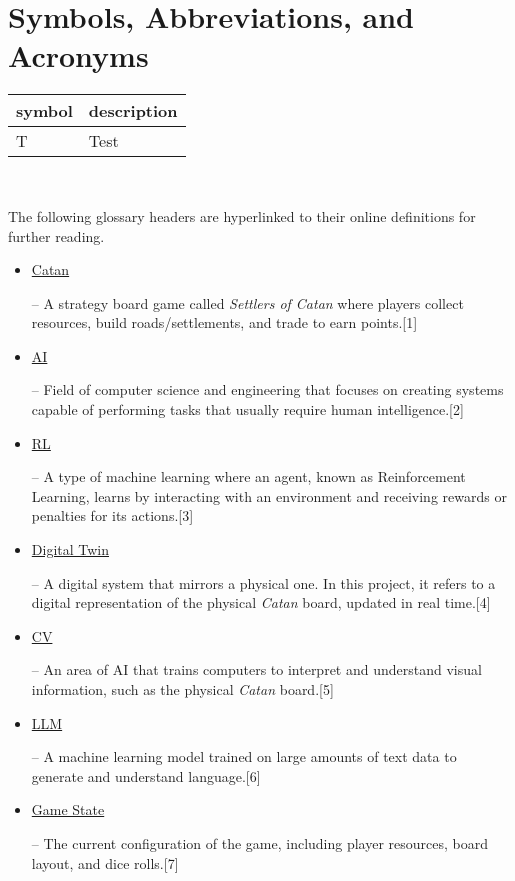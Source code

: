 \documentclass[12pt, titlepage]{article}
\newcommand{\CatanExt}{\href{https://en.wikipedia.org/wiki/Catan}{Catan}}
\newcommand{\AIExt}{\href{https://en.wikipedia.org/wiki/Artificial_intelligence}{AI}}
\newcommand{\RLExt}{\href{https://www.ibm.com/think/topics/reinforcement-learning}{RL}}
\newcommand{\DigitalTwinExt}{\href{https://en.wikipedia.org/wiki/Digital_twin}{Digital Twin}}
\newcommand{\CVExt}{\href{https://www.ibm.com/think/topics/computer-vision}{CV}}
\newcommand{\LLMExt}{\href{https://www.cloudflare.com/learning/ai/what-is-large-language-model/}{LLM}}
\newcommand{\GameStateExt}{\href{https://milvus.io/ai-quick-reference/what-is-a-state-in-rl}{Game State}}
\begin{document}
\newcommand{\Catan}{\hyperlink{glossary-catan}{Catan}}
\newcommand{\AI}{\hyperlink{glossary-ai}{AI}}
\newcommand{\RL}{\hyperlink{glossary-rl}{RL}}
\newcommand{\DigitalTwin}{\hyperlink{glossary-dt}{Digital Twin}}
\newcommand{\CV}{\hyperlink{glossary-cv}{CV}}
\newcommand{\LLM}{\hyperlink{glossary-llm}{LLM}}
\newcommand{\GameState}{\hyperlink{glossary-gamestate}{Game State}}
\newcommand{\NFR}{\hyperlink{glossary-nfr}{NFR}}
\newcommand{\FR}{\hyperlink{glossary-fr}{FR}}

\section{Symbols, Abbreviations, and Acronyms}

\renewcommand{\arraystretch}{1.2}
\begin{tabular}{l l} 
  \toprule		
  \textbf{symbol} & \textbf{description}\\
  \midrule 
  T & Test\\
  \bottomrule
\end{tabular}\\


The following glossary headers are hyperlinked to their online definitions for further reading.
\begin{itemize}
    \item \hypertarget{glossary-catan}{\CatanExt{}} – A strategy board game called \textit{Settlers of Catan} where players collect resources, build roads/settlements, and trade to earn points.[1]
    \item \hypertarget{glossary-ai}{\AIExt{}} – Field of computer science and engineering that focuses on creating systems capable of performing tasks that usually require human intelligence.[2]
    \item \hypertarget{glossary-rl}{\RLExt{}} – A type of machine learning where an agent, known as Reinforcement Learning, learns by interacting with an environment and receiving rewards or penalties for its actions.[3]
    \item \hypertarget{glossary-dt}{\DigitalTwinExt{}} – A digital system that mirrors a physical one. In this project, it refers to a digital representation of the physical \emph{Catan} board, updated in real time.[4]
    \item \hypertarget{glossary-cv}{\CVExt{}} – An area of AI that trains computers to interpret and understand visual information, such as the physical \emph{Catan} board.[5]
    \item \hypertarget{glossary-llm}{\LLMExt{}} – A machine learning model trained on large amounts of text data to generate and understand language.[6]
    \item \hypertarget{glossary-gamestate}{\GameStateExt{}} – The current configuration of the game, including player resources, board layout, and dice rolls.[7]
\end{itemize}
\end{document}
